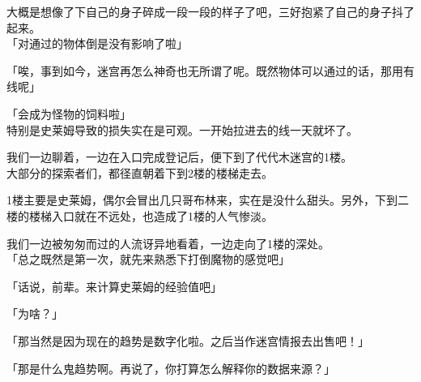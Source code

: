 大概是想像了下自己的身子碎成一段一段的样子了吧，三好抱紧了自己的身子抖了起来。\\

「对通过的物体倒是没有影响了啦」

「唉，事到如今，迷宫再怎么神奇也无所谓了呢。既然物体可以通过的话，那用有线呢」

「会成为怪物的饲料啦」\\

特别是史莱姆导致的损失实在是可观。一开始拉进去的线一天就坏了。

我们一边聊着，一边在入口完成登记后，便下到了代代木迷宫的1楼。\\

大部分的探索者们，都径直朝着下到2楼的楼梯走去。

1楼主要是史莱姆，偶尔会冒出几只哥布林来，实在是没什么甜头。另外，下到二楼的楼梯入口就在不远处，也造成了1楼的人气惨淡。

我们一边被匆匆而过的人流讶异地看着，一边走向了1楼的深处。\\

「总之既然是第一次，就先来熟悉下打倒魔物的感觉吧」

「话说，前辈。来计算史莱姆的经验值吧」

「为啥？」

「那当然是因为现在的趋势是数字化啦。之后当作迷宫情报去出售吧！」

「那是什么鬼趋势啊。再说了，你打算怎么解释你的数据来源？」

